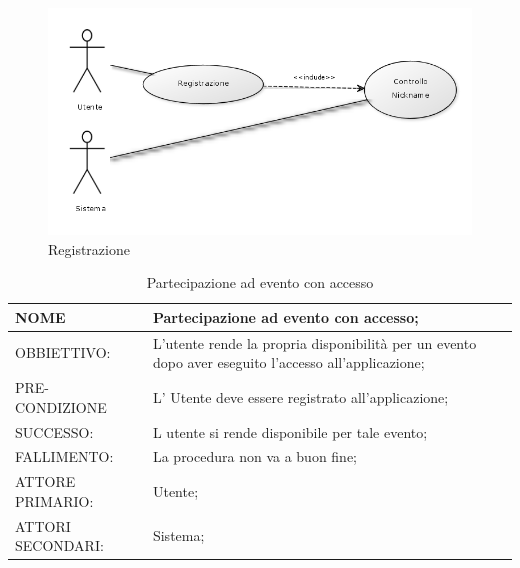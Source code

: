 \begin{figure}[H]
\centering
\includegraphics[scale=0.55]{img/registrazione.png}
\caption{Registrazione}
\label{fig:registrazione}
\end{figure}
\begin{table}[H]
\begin{tabular}{p{}|p{}}
\toprule
NOME & Partecipazione ad evento con accesso;\\
\hline
OBBIETTIVO: & L'utente rende la propria disponibilità per un evento dopo aver eseguito l'accesso all'applicazione;\\
\hline
PRE-CONDIZIONE & L' Utente deve essere registrato all'applicazione;\\
\hline
SUCCESSO: & L utente si rende disponibile per tale evento;\\
\hline
FALLIMENTO: & La procedura non va a buon fine;\\
\hline
ATTORE PRIMARIO: & Utente;\\
\hline
ATTORI SECONDARI: & Sistema;\\
\bottomrule
\end{tabular}
\caption{Partecipazione ad evento con accesso}
\label{table:par2}
\end{table}


